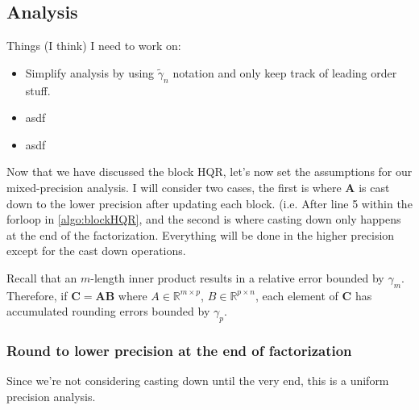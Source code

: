 \documentclass[review,onefignum,onetabnum]{siamart190516}
\newcommand{\R}{\mathbb{R}}
\newcommand{\bb}[1]{\mathbf{#1}}
\begin{document}
\subsection{Analysis}

Things (I think) I need to work on:
\begin{itemize}
	\item Simplify analysis by using $\tilde{\gamma}_n$ notation and only keep track of leading order stuff.
	\item asdf
	\item asdf
\end{itemize}

Now that we have discussed the block HQR, let's now set the assumptions for our mixed-precision analysis. 
I will consider two cases, the first is where $\bb{A}$ is cast down to the lower precision after updating each block. (i.e. After line 5 within the forloop in \cref{algo:blockHQR}, and the second is where casting down only happens at the end of the factorization.
Everything will be done in the higher precision except for the cast down operations.

Recall that an $m$-length inner product results in a relative error bounded by $\gamma_{m}$.
Therefore, if $\bb{C}=\bb{AB}$ where $A\in\R^{m\times p}$, $B\in\R^{p\times n}$, each element of $\bb{C}$ has accumulated rounding errors bounded by $\gamma_p$.

\subsubsection{Round to lower precision at the end of factorization}
Since we're not considering casting down until the very end, this is a uniform precision analysis.
\end{document}
